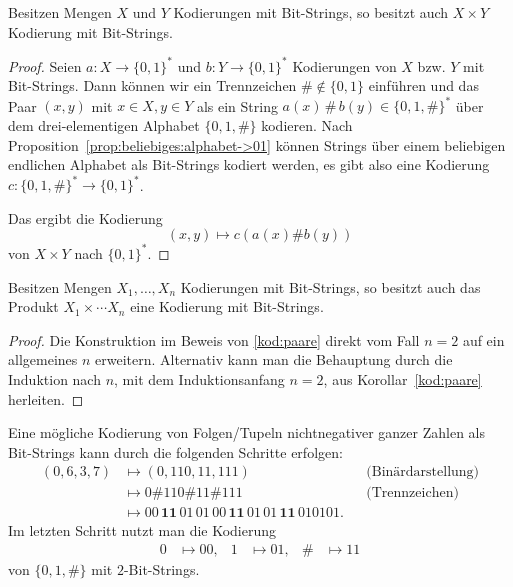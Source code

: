 \begin{prop} \label{kod:paare}
	Besitzen Mengen $X$ und $Y$ Kodierungen mit Bit-Strings, so besitzt auch $X \times Y$ Kodierung mit Bit-Strings. 
\end{prop} 
\begin{proof}
	Seien $ a : X \to \{0,1\}^\ast$ und $b : Y \to \{0,1\}^\ast$ Kodierungen von $X$ bzw. $Y$ mit Bit-Strings. Dann können wir ein Trennzeichen $\# \not\in \{0,1\}$ einführen und das Paar $(x,y)$ mit $x \in X, y \in Y$ als ein String $a(x) \, \# \,  b(y) \in \{0,1,\#\}^\ast$ über dem drei-elementigen Alphabet $\{0,1,\#\}$ kodieren. Nach Proposition~\ref{prop:beliebiges:alphabet->01} können Strings über einem beliebigen endlichen Alphabet als Bit-Strings kodiert werden, es gibt also eine Kodierung $c : \{0,1,\#\}^\ast \to \{0,1\}^\ast$.

	 Das ergibt die Kodierung 
	 \[
	 		(x,y) \mapsto c ( a(x) \# b(y))
	 \] 
	 von $X \times Y$ nach $\{0,1\}^\ast$. 
\end{proof} 

\begin{kor}
	Besitzen Mengen $X_1,\ldots,X_n$ Kodierungen mit Bit-Strings, so besitzt auch das Produkt $X_1 \times \cdots X_n$ eine Kodierung mit Bit-Strings. 
\end{kor} 
\begin{proof} 
Die Konstruktion im Beweis von \eqref{kod:paare} direkt vom Fall $n=2$ auf ein allgemeines $n$ erweitern. Alternativ kann man die Behauptung durch die Induktion nach $n$, mit dem Induktionsanfang $n=2$, aus Korollar~\ref{kod:paare} herleiten. 
\end{proof} 

\begin{bsp}
	Eine mögliche Kodierung von Folgen/Tupeln nichtnegativer ganzer Zahlen als Bit-Strings kann durch die folgenden Schritte erfolgen: 
	\begin{align*}
		(0, 6,3,7) & \mapsto (0,110,11,111)  & & \text{(Binärdarstellung)} 
		\\ & \mapsto 0 \mathbf{\#} 110 \mathbf{\#} 11 \mathbf{\#} 111 & & \text{(Trennzeichen)} 		
		\\ & \mapsto  00 \, \mathbf{11} \,  01 \,  01 \, 00 \, \mathbf{11 }\, 01 \, 01 \, \mathbf{11} \, 01 01 01.
	\end{align*}
	Im letzten Schritt nutzt man die Kodierung 
	\begin{align*}
		0 & \mapsto 00, & 1& \mapsto 01, &  \# & \mapsto 11
	\end{align*}
	von $\{0,1,\#\}$ mit $2$-Bit-Strings. 
\end{bsp} 


